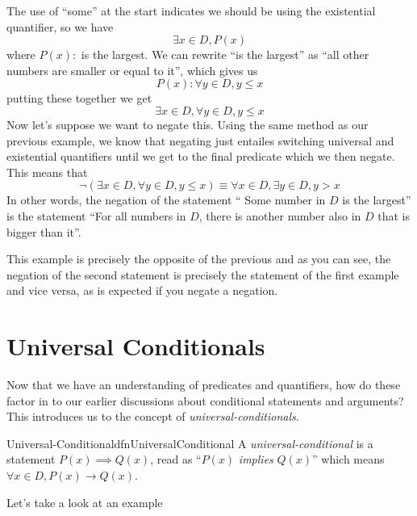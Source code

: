 The use of ``some'' at the start indicates we should be using the existential quantifier, so we have
$$\exists x \in D, P(x)$$
where $P(x):$ is the largest. We can rewrite ``is the largest'' as ``all other numbers are smaller or equal to it'', which gives us
$$P(x): \forall y \in D, y \leq x$$
putting these together we get
$$\exists x \in D, \forall y \in D, y \leq x$$
Now let's suppose we want to negate this. Using the same method as our previous example, we know that negating just entailes switching universal and existential quantifiers until we get to the final predicate which we then negate. This means that
$$\lnot \left(\exists x \in D, \forall y \in D, y \leq x\right) \equiv \forall x \in D, \exists y \in D, y > x$$
In other words, the negation of the statement `` Some number in $D$ is the largest'' is the statement ``For all numbers in $D$, there is another number also in $D$ that is bigger than it''.

This example is precisely the opposite of the previous and as you can see, the negation of the second statement is precisely the statement of the first example and vice versa, as is expected if you negate a negation.

\section{Universal Conditionals}
Now that we have an understanding of predicates and quantifiers, how do these factor in to our earlier discussions about conditional statements and arguments? This introduces us to the concept of \emph{universal-conditionals}.

\begin{dfn}[label={def:universalConditional}]{Universal-Conditional}{dfnUniversalConditional}
    A \emph{universal-conditional} is a statement $P(x) \implies Q(x)$, read as ``$P(x)$ \emph{implies} $Q(x)$'' which means $\forall x \in D, P(x) \to Q(x)$.
\end{dfn}

Let's take a look at an example

